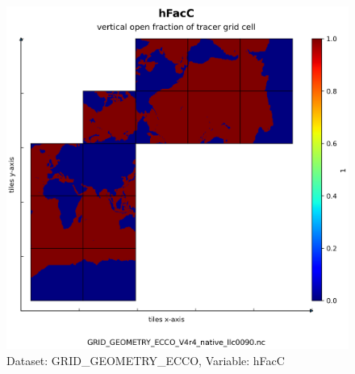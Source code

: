 \begin{figure}[H]
\centering
\includegraphics[scale=0.55]{../images/plots/native_plots_coords/Geometry_Parameters_for_the_Lat-Lon-Cap_90_(llc90)_Native_Model_Grid_(Version_4_Release_4)/hFacC.png}
\caption{Dataset: GRID\_GEOMETRY\_ECCO, Variable: hFacC}
\label{tab:table-GRID_GEOMETRY_ECCO_hFacC-Plot}
\end{figure}
\pagebreak
